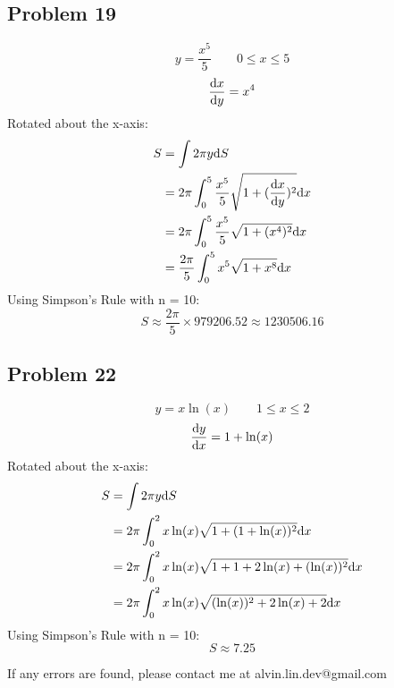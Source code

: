 \documentclass[letterpaper, 12pt]{math}
\begin{document}
\subsection*{Problem 19}
\[ y = \frac{x^{5}}{5} \quad \quad 0 \leq x \leq 5 \]
\[ \frac{\mathrm{d}{x}}{\mathrm{d}{y}} = x^{4} \]
Rotated about the x-axis:
\begin{align*}
  S &= \int{2\pi y\mathrm{d}{S}} \\
  &= 2\pi\int_{0}^{5}{
    \frac{x^{5}}{5}\sqrt{1+(\frac{\mathrm{d}{x}}{\mathrm{d}{y}})^{2}}\mathrm{d}{x}} \\
  &= 2\pi\int_{0}^{5}{\frac{x^{5}}{5}\sqrt{1+(x^{4})^{2}}\mathrm{d}{x}} \\
  &= \frac{2\pi}{5}\int_{0}^{5}{x^{5}\sqrt{1+x^{8}}\mathrm{d}{x}} \\
\end{align*}
Using Simpson's Rule with n = 10:
\[ S \approx \frac{2\pi}{5} \times 979206.52 \approx 1230506.16 \]

\subsection*{Problem 22}
\[ y = x\ln(x) \quad \quad 1 \leq x \leq 2 \]
\[ \frac{\mathrm{d}{y}}{\mathrm{d}{x}} = 1+\ln(x) \]
Rotated about the x-axis:
\begin{align*}
  S &= \int{2\pi y\mathrm{d}{S}} \\
  &= 2\pi\int_{0}^{2}{x\ln(x)\sqrt{1+(1+\ln(x))^{2}}\mathrm{d}{x}} \\
  &= 2\pi\int_{0}^{2}{x\ln(x)\sqrt{1+1+2\ln(x)+(\ln(x))^{2}}\mathrm{d}{x}} \\
  &= 2\pi\int_{0}^{2}{x\ln(x)\sqrt{(\ln(x))^{2}+2\ln(x)+2}\mathrm{d}{x}}
\end{align*}
Using Simpson's Rule with n = 10:
\[ S \approx 7.25 \]

\begin{center}
  If any errors are found, please contact me at alvin.lin.dev@gmail.com
\end{center}
\end{document}
